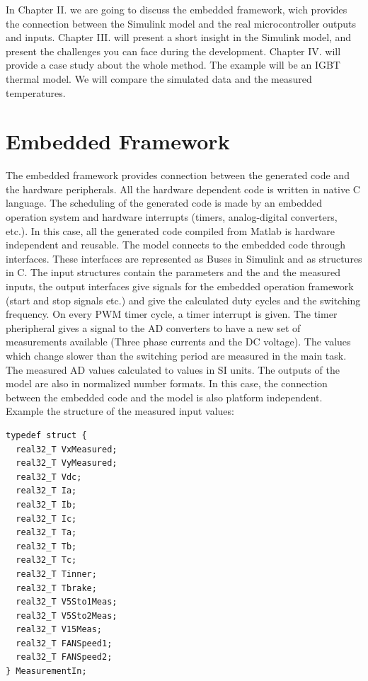 In Chapter II. we are going to discuss the embedded framework, wich provides the connection between the Simulink model and the real microcontroller outputs and inputs. Chapter III. will present a short insight in the Simulink model, and present the challenges you can face during the development. Chapter IV. will provide a case study about the whole method. The example will be an IGBT thermal model. We will compare the simulated data and the measured temperatures.


\section{Embedded Framework}

The embedded framework provides connection between the generated code and the hardware peripherals. All the hardware dependent code is written in native C language. The scheduling of the generated code is made by an embedded operation system and hardware interrupts (timers, analog-digital converters, etc.). In this case, all the generated code compiled from Matlab is hardware independent and reusable. The model connects to the embedded code through interfaces. These interfaces are represented as Buses in Simulink and as structures in C. The input structures contain the parameters and the and the measured inputs, the output interfaces give signals for the embedded operation framework (start and stop signals etc.) and give the calculated duty cycles and the switching frequency. 
On every PWM timer cycle, a timer interrupt is given. The timer pheripheral gives a signal to the AD converters to have a new set of measurements available (Three phase currents and the DC voltage). The values which change slower than the switching period are measured in the main task. The measured AD values calculated to values in SI units. The outputs of the model are also in normalized number formats. In this case, the connection between the embedded code and the model is also platform independent. Example the structure of the measured input values:

\begin{absolutelynopagebreak}
\begin{lstlisting}
typedef struct { 
  real32_T VxMeasured; 
  real32_T VyMeasured; 
  real32_T Vdc; 
  real32_T Ia; 
  real32_T Ib; 
  real32_T Ic; 
  real32_T Ta; 
  real32_T Tb; 
  real32_T Tc; 
  real32_T Tinner; 
  real32_T Tbrake; 
  real32_T V5Sto1Meas; 
  real32_T V5Sto2Meas; 
  real32_T V15Meas; 
  real32_T FANSpeed1; 
  real32_T FANSpeed2; 
} MeasurementIn;

\end{lstlisting}
\end{absolutelynopagebreak}

